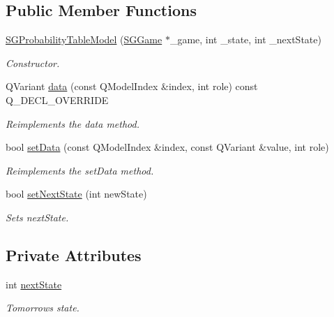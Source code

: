 \subsection*{Public Member Functions}
\begin{DoxyCompactItemize}
\item 
\hyperlink{classSGProbabilityTableModel_a31bfe886c2f733a547b2973e729a953c}{S\+G\+Probability\+Table\+Model} (\hyperlink{classSGGame}{S\+G\+Game} $\ast$\+\_\+game, int \+\_\+state, int \+\_\+next\+State)
\begin{DoxyCompactList}\small\item\em Constructor. \end{DoxyCompactList}\item 
Q\+Variant \hyperlink{classSGProbabilityTableModel_a28e4eb8b523f04220d65dd92261759e4}{data} (const Q\+Model\+Index \&index, int role) const Q\+\_\+\+D\+E\+C\+L\+\_\+\+O\+V\+E\+R\+R\+I\+DE
\begin{DoxyCompactList}\small\item\em Reimplements the data method. \end{DoxyCompactList}\item 
bool \hyperlink{classSGProbabilityTableModel_a79cad23bdbc109338f525caef8a8cf47}{set\+Data} (const Q\+Model\+Index \&index, const Q\+Variant \&value, int role)
\begin{DoxyCompactList}\small\item\em Reimplements the set\+Data method. \end{DoxyCompactList}\item 
\mbox{\label{classSGProbabilityTableModel_af3a2a8e9e73f51e455bc24dcae52e05a}} 
bool \hyperlink{classSGProbabilityTableModel_af3a2a8e9e73f51e455bc24dcae52e05a}{set\+Next\+State} (int new\+State)
\begin{DoxyCompactList}\small\item\em Sets next\+State. \end{DoxyCompactList}\end{DoxyCompactItemize}
\subsection*{Private Attributes}
\begin{DoxyCompactItemize}
\item 
int \hyperlink{classSGProbabilityTableModel_af7619d3adeb71d6ff7f75f78f4b0e34f}{next\+State}
\begin{DoxyCompactList}\small\item\em Tomorrow\textquotesingle{}s state. \end{DoxyCompactList}\end{DoxyCompactItemize}
